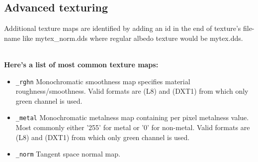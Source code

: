 \documentclass[Orbiter Developer Manual.tex]{subfiles}
\begin{document}
\subsection{Advanced texturing}
Additional texture maps are identified by adding an id in the end of texture's file-name like mytex\_norm.dds where regular albedo texture would be mytex.dds.\\\ 

\textbf{Here's a list of most common texture maps:}
\begin{itemize}
\item	\texttt{\_rghn} Monochromatic smoothness map specifies material roughness/smoothness. Valid formats are (L8) and (DXT1) from which only green channel is used.
\item	\texttt{\_metal} Monochromatic metalness map containing per pixel metalness value. Most commonly either '255' for metal or '0' for non-metal. Valid formats are (L8) and (DXT1) from which only green channel is used.
\item	\texttt{\_norm} Tangent space normal map. 
\end{itemize}
\end{document}
